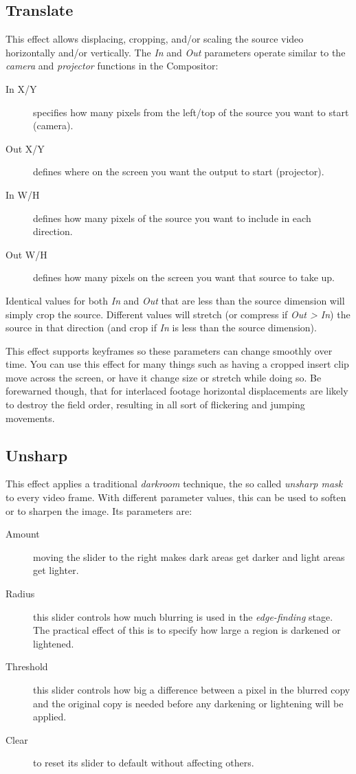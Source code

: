 {\subsection{Translate}%
\label{sub:translate}

This effect allows displacing, cropping, and/or scaling the source video horizontally and/or vertically. The \textit{In} and \textit{Out} parameters operate similar to the \textit{camera} and \textit{projector} functions in the Compositor:

\begin{description}
    \item[In X/Y] specifies how many pixels from the left/top of the source you want to start (camera).
    \item[Out X/Y] defines where on the screen you want the output to start (projector).
    \item[In W/H] defines how many pixels of the source you want to include in each direction.
    \item[Out W/H] defines how many pixels on the screen you want that source to take up.
\end{description}

Identical values for both \textit{In} and \textit{Out} that are less than the source dimension will simply crop the source. Different values will stretch (or compress if \textit{Out > In}) the source in that direction (and crop if \textit{In} is less than the source dimension).

This effect supports keyframes so these parameters can change smoothly over time. You can use this effect for many things such as having a cropped insert clip move across the screen, or have it change size or stretch while doing so. Be forewarned though, that for interlaced footage horizontal displacements are likely to destroy the field order, resulting in all sort of flickering and jumping movements.

\subsection{Unsharp}%
\label{sub:Unsharp}

This effect applies a traditional \textit{darkroom} technique, the so called \textit{unsharp mask} to every video frame. With different parameter values, this can be used to soften or to sharpen the image. Its parameters are:

\begin{description}
    \item[Amount] moving the slider to the right makes dark areas get darker and light areas get lighter.
    \item[Radius] this slider controls how much blurring is used in the \textit{edge-finding} stage. The practical effect of this is to specify how large a region is darkened or lightened.
    \item[Threshold] this slider controls how big a difference between a pixel in the blurred copy and the original copy is needed before any darkening or lightening will be applied.
    \item[Clear] to reset its slider to default without affecting others.
\end{description}

}

